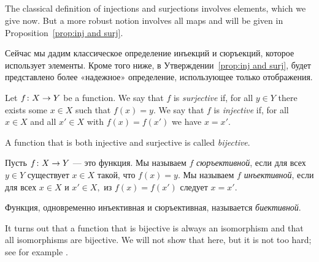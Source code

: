 \documentclass[CT4S-EN-RU]{subfiles}
\begin{document}

\subsection{}

\begin{blockENG}
The classical definition of injections and surjections involves elements, which we give now. But a more robust notion involves all maps and will be given in Proposition~\ref{prop:inj and surj}.
\end{blockENG}

\begin{blockRUS}
Сейчас мы дадим классическое определение инъекций и сюръекций, которое использует элементы. Кроме того ниже, в Утверждении~\ref{prop:inj and surj}, будет представлено более «надежное» определение, использующее только отображения.
\end{blockRUS}

\begin{definitionENG}\label{def:inj,surj,bij}
Let $f\colon X\rightarrow Y$ be a function. We say that $f$ is {\em surjective} if, for all $y\in Y$ there exists some $x\in X$ such that $f(x)=y.$ We say that $f$ is {\em injective} if, for all $x\in X$ and all $x'\in X$ with $f(x)=f(x')$ we have $x=x'.$

A function that is both injective and surjective is called {\em bijective}.
\end{definitionENG}

\begin{definitionRUS}\label{def:inj,surj,bij}
Пусть $f\colon X\rightarrow Y$ — это функция. Мы называем $f$ {\em сюръективной}, если для всех $y\in Y$ существует $x\in X$ такой, что $f(x)=y.$ Мы называем $f$ {\em инъективной}, если для всех $x\in X$ и $x'\in X,$ из $f(x)=f(x')$ следует $x=x'.$

Функция, одновременно инъективная и сюръективная, называется {\em биективной}.
\end{definitionRUS}

\begin{remarkENG}
It turns out that a function that is bijective is always an isomorphism and that all isomorphisms are bijective. We will not show that here, but it is not too hard; see for example \cite[Theorem 5.4]{Big}.
\end{remarkENG}
\end{document}
